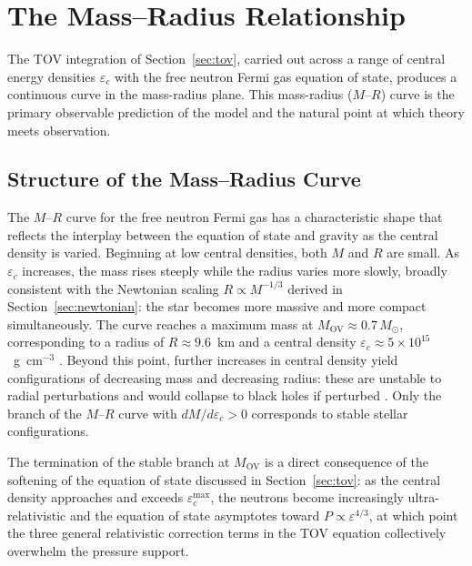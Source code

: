\section{The Mass--Radius Relationship}
\label{sec:mass-radius}

The TOV integration of Section~\ref{sec:tov}, carried out across a range
of central energy densities $\varepsilon_c$ with the free neutron Fermi
gas equation of state, produces a continuous curve in the mass-radius
plane. This mass-radius ($M$--$R$) curve is the primary observable
prediction of the model and the natural point at which theory meets
observation.
\subsection{Structure of the Mass--Radius Curve}

The $M$--$R$ curve for the free neutron Fermi gas has a characteristic
shape that reflects the interplay between the equation of state and
gravity as the central density is varied. Beginning at low central
densities, both $M$ and $R$ are small. As $\varepsilon_c$ increases, the
mass rises steeply while the radius varies more slowly, broadly
consistent with the Newtonian scaling $R \propto M^{-1/3}$ derived in
Section~\ref{sec:newtonian}: the star becomes more massive and more
compact simultaneously. The curve reaches a maximum mass at
$M_{\mathrm{OV}} \approx 0.7\,M_\odot$, corresponding to a radius of
$R \approx 9.6$~km and a central density $\varepsilon_c \approx
5\times10^{15}$~g~cm$^{-3}$ \cite{Oppy}. Beyond this point,
further increases in central density yield configurations of decreasing
mass and decreasing radius: these are unstable to radial perturbations
and would collapse to black holes if perturbed \cite{shapiro_teukolsky_1983}. Only
the branch of the $M$--$R$ curve with $dM/d\varepsilon_c > 0$ corresponds
to stable stellar configurations.

The termination of the stable branch at $M_{\mathrm{OV}}$ is a direct
consequence of the softening of the equation of state discussed in
Section~\ref{sec:tov}: as the central density
approaches and exceeds $\varepsilon_c^{\mathrm{max}}$, the neutrons
become increasingly ultra-relativistic and the equation of state
asymptotes toward $P \propto \varepsilon^{4/3}$, at which point the
three general relativistic correction terms in the TOV equation
collectively overwhelm the pressure support.


